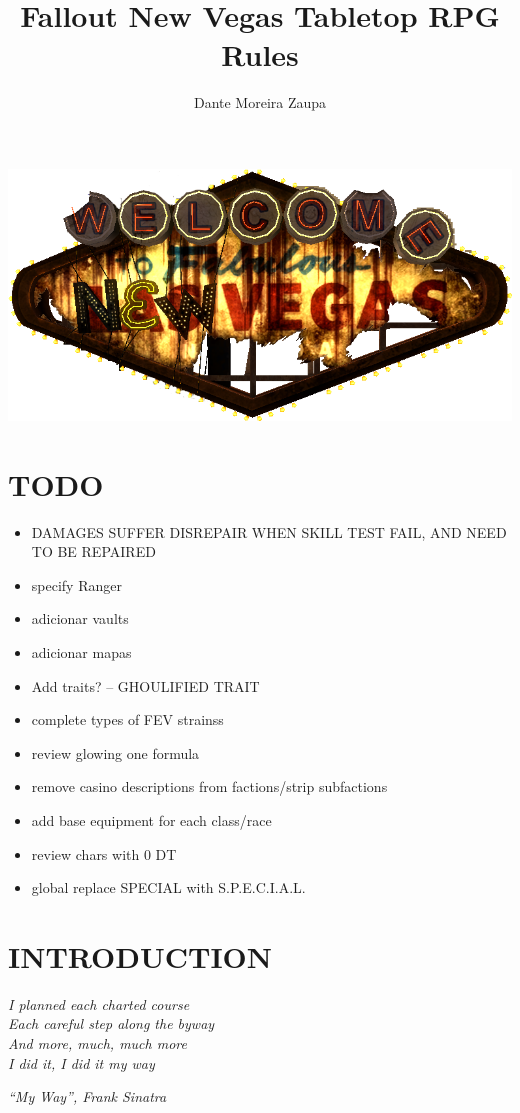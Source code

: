 \documentclass[11pt]{article} %
\title{Fallout New Vegas Tabletop RPG Rules}
\author{Dante Moreira Zaupa}
\begin{document}
\maketitle
\begin{center}
\includegraphics[scale=0.5]{logo_new_vegas.png}
\end{center}
\newpage
\tableofcontents
\newpage

\section{TODO}
\begin{itemize}
\item DAMAGES SUFFER DISREPAIR WHEN SKILL TEST FAIL, AND NEED TO BE REPAIRED
\item specify Ranger
\item adicionar vaults
\item adicionar mapas
\item Add traits? -- GHOULIFIED TRAIT
\item complete types of FEV strainss
\item review glowing one formula
\item remove casino descriptions from factions/strip subfactions
\item add base equipment for each class/race
\item review chars with 0 DT
\item global replace SPECIAL with S.P.E.C.I.A.L. 
\end{itemize}
\newpage

\section{INTRODUCTION}

\epigraph{\textit{I planned each charted course \\
Each careful step along the byway \\
And more, much, much more \\
I did it, I did it my way}}{\textit{``My Way'', Frank Sinatra}}
\end{document}
